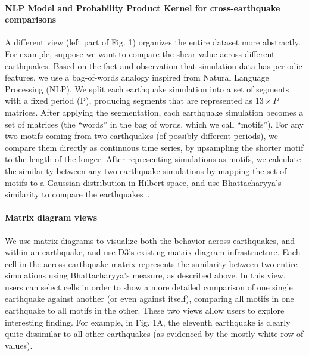 \paragraph*{NLP Model and Probability Product Kernel for cross-earthquake comparisons}
\label{sec:method}
A different view (left part of Fig. 1) organizes the entire dataset more abstractly. For example, suppose we want to compare the shear value across different earthquakes. Based on the fact and observation that simulation data has periodic features, we use a bag-of-words analogy inspired from Natural Language Processing (NLP). We split each earthquake simulation into a set of segments with a fixed period (P), producing segments that are represented as  $13 \times P$ matrices. After applying the segmentation, each earthquake simulation becomes a set of matrices (the ``words'' in the bag of words, which we call ``motifs''). For any two motifs coming from two earthquakes (of possibly different periods), we compare them directly as continuous time series, by upsampling the shorter motif to the length of the longer. After representing simulations as motifs, we calculate the similarity between any two earthquake simulations by mapping the set of motifs to a Gaussian distribution in Hilbert space, and use Bhattacharyya's similarity to compare the earthquakes~\cite{conf/icml/KondorJ03}.

\paragraph*{Matrix diagram views}
\label{matrixvis}
We use matrix diagrams to visualize both the behavior across earthquakes, and within an earthquake, and use D3's existing matrix diagram infrastructure. Each cell in the across-earthquake matrix represents the similarity between two entire simulations using Bhattacharyya's measure, as described above. In this view, users can select cells in order to show a more detailed comparison of one single earthquake against another (or even against itself), comparing all motifs in one earthquake to all motifs in the other. These two views allow users to explore interesting finding. For example, in Fig. 1A, the eleventh earthquake is clearly quite dissimilar to all other earthquakes (as evidenced by the mostly-white row of values).


